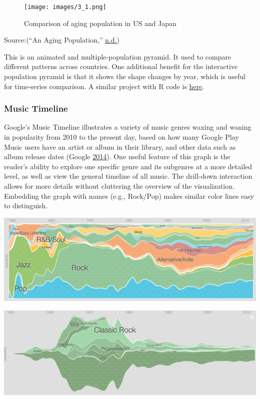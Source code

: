 \documentclass[]{book}
\begin{document}
\begin{figure}
\centering
\texttt{[image: images/3\_1.png]}
\caption{Comparison of aging population in US and Japan}
\end{figure}

Source:(``An Aging Population,'' \protect\hyperlink{ref-animated_pyramid}{n.d.})

This is an animated and multiple-population pyramid. It used to compare different patterns across countries. One additional benefit for the interactive population pyramid is that it shows the shape changes by year, which is useful for time-series comparison. A similar project with R code is \href{https://www.r-bloggers.com/who-is-old-visualizing-the-concept-of-prospective-ageing-with-animated-population-pyramids/}{here}.

\hypertarget{music-timeline}{%
\subsubsection{Music Timeline}\label{music-timeline}}

Google's Music Timeline illustrates a variety of music genres waxing and waning in popularity from 2010 to the present day, based on how many Google Play Music users have an artist or album in their library, and other data such as album release dates (Google \protect\hyperlink{ref-google_music}{2014}). One useful feature of this graph is the reader's ability to explore one specific genre and its subgenres at a more detailed level, as well as view the general timeline of all music. The drill-down interaction allows for more details without cluttering the overview of the visualization. Embedding the graph with names (e.g., Rock/Pop) makes similar color lines easy to distinguish.

\includegraphics{images/music_timeline.png}

\includegraphics{images/music_timeline_rock.png}
\end{document}
